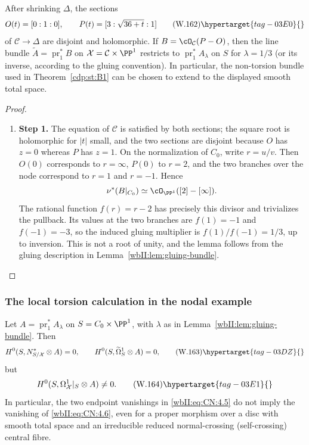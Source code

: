 \begin{lemma}
\hypertarget{tag-03I9}{}\label{wbII:lem:extending-gluing}

After shrinking $\Delta$, the sections
\[
 O(t)=[0:1:0],\qquad
 P(t)=[3:\sqrt{36+t}:1]
\tag{W.162}\hypertarget{tag-03E0}{}\label{wbII:eq:CN:4.5a}
\]
of $\mathcal C\to\Delta$ are disjoint and holomorphic.  If
$B=\cO_{\mathcal C}(P-O)$, then the line bundle
$\widetilde A=\operatorname{pr}_1^*B$ on $\mathcal X=\mathcal C\times\PP^1$
restricts to $\operatorname{pr}_1^*A_{\lambda}$ on $S$ for
$\lambda=1/3$ (or its inverse, according to the gluing convention).  In
particular, the non-torsion bundle used in Theorem~\ref{cdp:st:B1} can
be chosen to extend to the displayed smooth total space.
\end{lemma}



\begin{proof}
\begin{enumerate}[label={$\langle1\rangle$\arabic*.},leftmargin=*]
\item 
\noindent\textbf{Step 1.} The equation of $\mathcal C$ is satisfied by both sections; the square root
is holomorphic for $|t|$ small, and the two sections are disjoint because
$O$ has $z=0$ whereas $P$ has $z=1$.  On the normalization of $C_0$, write
$r=u/v$.  Then $O(0)$ corresponds to $r=\infty$, $P(0)$ to $r=2$, and the
two branches over the node correspond to $r=1$ and $r=-1$.  Hence
\[
 \nu^*(B|_{C_0})\simeq\cO_{\PP^1}([2]-[\infty]).
\]
The rational function $f(r)=r-2$ has precisely this divisor and trivializes
the pullback.  Its values at the two branches are $f(1)=-1$ and
$f(-1)=-3$, so the induced gluing multiplier is $f(1)/f(-1)=1/3$,
up to inversion.  This is not a root of unity, and the lemma follows from
the gluing description in Lemma~\ref{wbII:lem:gluing-bundle}.

\end{enumerate}
\end{proof}



\subsubsection*{The local torsion calculation in the nodal example}

Let $A=\operatorname{pr}_1^*A_\lambda$ on
$S=C_0\times\PP^1$, with $\lambda$ as in Lemma~\ref{wbII:lem:gluing-bundle}.
Then
\[
 H^0(S,N^*_{S/\mathcal X}\otimes A)=0,
 \qquad
 H^0(S,\widetilde\Omega^1_S\otimes A)=0,
 \tag{W.163}\hypertarget{tag-03DZ}{}\label{wbII:eq:CN:4.5}
\]
but
\[
 H^0(S,\Omega^1_{\mathcal X}|_S\otimes A)\ne0.
 \tag{W.164}\hypertarget{tag-03E1}{}\label{wbII:eq:CN:4.6}
\]
In particular, the two endpoint vanishings in \eqref{wbII:eq:CN:4.5} do not imply the
vanishing of \eqref{wbII:eq:CN:4.6}, even for a proper morphism over a disc with smooth total
space and an irreducible reduced normal-crossing (self-crossing) central
fibre.


